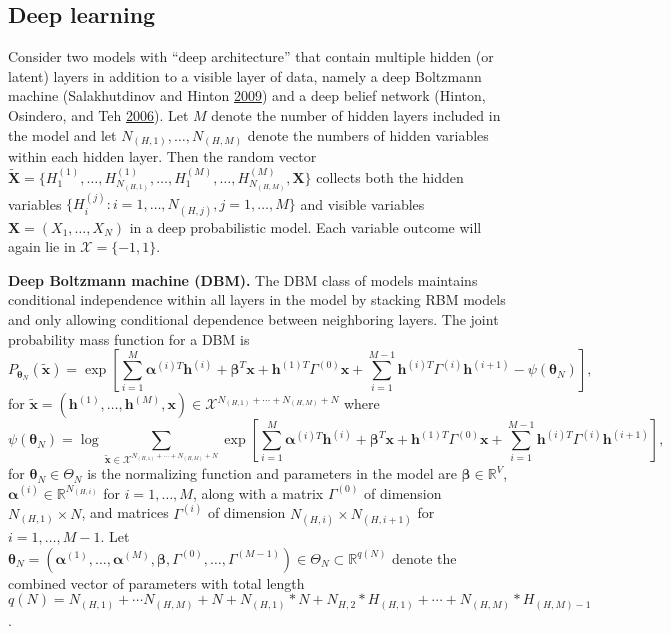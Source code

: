 \documentclass[12pt]{article}
\theoremstyle{definition}
\begin{document}
\subsection{Deep learning}\label{deep-learning}

Consider two models with ``deep architecture'' that contain multiple
hidden (or latent) layers in addition to a visible layer of data, namely
a deep Boltzmann machine (Salakhutdinov and Hinton
\protect\hyperlink{ref-salakhutdinov2009deep}{2009}) and a deep belief
network (Hinton, Osindero, and Teh
\protect\hyperlink{ref-hinton2006fast}{2006}). Let \(M\) denote the
number of hidden layers included in the model and let
\(N_{(H,1)}, \dots, N_{(H,M)}\) denote the numbers of hidden variables
within each hidden layer. Then the random vector
\(\tilde{\boldsymbol X} = \{H^{(1)}_1, \dots, H^{(1)}_{N_{(H,1)}}, \dots, H^{(M)}_1, \dots, H^{(M)}_{N_{(H,M)}}, \boldsymbol X\}\)
collects both the hidden variables
\(\{ H_{i}^{(j)} : i=1,\ldots, N_{(H,j)}, j=1,\ldots,M\}\) and visible
variables \(\boldsymbol X =(X_1,\ldots,X_N)\) in a deep probabilistic
model. Each variable outcome will again lie in
\(\mathcal{X} = \{-1,1\}\).

\textbf{Deep Boltzmann machine (DBM).} The DBM class of models maintains
conditional independence within all layers in the model by stacking RBM
models and only allowing conditional dependence between neighboring
layers. The joint probability mass function for a DBM is \[
P_{\boldsymbol \theta_N} (\tilde{\boldsymbol x}) = \exp\left[ \sum\limits_{i = 1}^M\boldsymbol \alpha^{(i)T} \boldsymbol h^{(i)} + \boldsymbol \beta^T \boldsymbol x + \boldsymbol h^{(1)T} \Gamma^{(0)} \boldsymbol x + \sum\limits_{i = 1}^{M - 1} \boldsymbol h^{(i)T} \Gamma^{(i)} \boldsymbol h^{(i + 1)} - \psi(\boldsymbol \theta_N) \right], 
\] for
\(\tilde{\boldsymbol x} = (\boldsymbol h^{(1)}, \dots, \boldsymbol h^{(M)}, \boldsymbol x) \in \mathcal{X}^{N_{(H,1)} + \cdots + N_{(H,M)} +N}\)
where \[
\psi(\boldsymbol \theta_N) = \log \sum\limits_{\tilde{\boldsymbol x} \in \mathcal{X}^{N_{(H,1)} + \cdots + N_{(H,M)} +N}} \exp\left[ \sum\limits_{i = 1}^M\boldsymbol \alpha^{(i)T} \boldsymbol h^{(i)} + \boldsymbol \beta^T \boldsymbol x + \boldsymbol h^{(1)T} \Gamma^{(0)} \boldsymbol x + \sum\limits_{i = 1}^{M - 1} \boldsymbol h^{(i)T} \Gamma^{(i)} \boldsymbol h^{(i + 1)}\right],
\] for \(\boldsymbol \theta_N \in \Theta_N\) is the normalizing function
and parameters in the model are \(\boldsymbol \beta \in \mathbb{R}^V\),
\(\boldsymbol \alpha^{(i)} \in \mathbb{R}^{N_{(H,i)}}\) for
\(i = 1, \dots, M\), along with a matrix \(\Gamma^{(0)}\) of dimension
\(N_{(H,1)} \times N\), and matrices \(\Gamma^{(i)}\) of dimension
\(N_{(H,i)} \times N_{(H,i+1)}\) for \(i = 1, \dots, M-1\). Let
\(\boldsymbol \theta_N = (\boldsymbol \alpha^{(1)}, \dots, \boldsymbol \alpha^{(M)}, \boldsymbol \beta,\Gamma^{(0)}, \dots, \Gamma^{(M - 1)}) \in \Theta_N \subset \mathbb{R}^{q(N)}\)
denote the combined vector of parameters with total length
\(q(N)= N_{(H,1)}+\cdots N_{(H,M)} + N + N_{(H,1)}*N+N_{H,2}*H_{(H,1)}+\cdots +N_{(H,M)}*H_{(H,M)-1}\).
\end{document}
